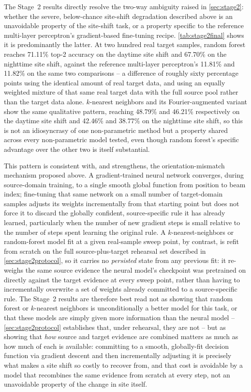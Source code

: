\documentclass{iutbscthesis}
\begin{document}
The Stage~2 results directly resolve the two-way ambiguity raised in \autoref{sec:stage2}: whether the severe, below-chance site-shift degradation described above is an unavoidable property of the site-shift task, or a property specific to the reference multi-layer perceptron's gradient-based fine-tuning recipe. \autoref{tab:stage2final} shows it is predominantly the latter. At two hundred real target samples, random forest reaches 71.11\% top-2 accuracy on the daytime site shift and 67.70\% on the nighttime site shift, against the reference multi-layer perceptron's 11.81\% and 11.82\% on the same two comparisons -- a difference of roughly sixty percentage points using the identical amount of real target data, and using an equally weighted mixture of that same real target data with the full source pool rather than the target data alone. $k$-nearest neighbors and its Fourier-augmented variant show the same qualitative pattern, reaching 48.79\% and 46.21\% respectively on the daytime site shift and 42.46\% and 38.77\% on the nighttime site shift, so this is not an idiosyncrasy of one non-parametric method but a property shared across every non-parametric model tested, even though random forest's specific advantage over the other two is itself substantial.

This pattern is consistent with, and strengthens, the orientation-mismatch mechanism proposed above. A gradient-trained neural network converges, during source-domain training, to a single smooth global function from position to beam index; fine-tuning that same network on a small number of target-domain samples adjusts its weights incrementally from that starting point but does not force it to discard the globally confident, source-specific rule it has already learned, particularly when the number of new gradient steps is small relative to the number of steps spent learning the original rule. A $k$-nearest-neighbors or random-forest model fit at a given real-sample sweep point, by contrast, is refit from scratch on the full source-plus-target rehearsal set described in \autoref{sec:stage2protocol}, so it carries no \emph{persisted} state from any previous fit: it re-weighs the same source evidence the neural model's checkpoint was pretrained on directly against the target evidence at every sweep point, rather than having to incrementally overwrite a set of weights already committed to a source-specific rule. The Stage~2 results are therefore best read not as showing that random forest or $k$-nearest neighbors is unconditionally a better model for this task, or that these models are simply given more information than the neural model -- \autoref{sec:stage2protocol} establishes that, under rehearsal, they are not -- but as showing that \emph{how} source and target evidence are combined matters as much as how much of each is available: committing to a smooth, globally-fit decision function via gradient descent and then incrementally adjusting it is precisely what makes a site shift so costly to recover from, and that cost is avoidable by a model that recombines the same evidence from scratch at every step, not an unavoidable property of the change in site itself.
\end{document}
